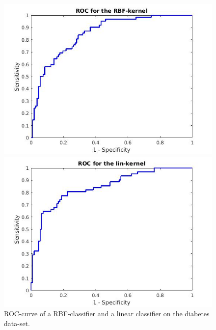 \documentclass[•]{article}
\begin{document}
\begin{figure}[h!]
\centering
\begin{minipage}{.45\textwidth}
\includegraphics[width=.8\textwidth]{rocrbfdiabetes.jpg}
\end{minipage}
\begin{minipage}{.45\textwidth}
\includegraphics[width=.8\textwidth]{roclindiabetes.jpg}
\end{minipage}
\caption{ROC-curve of a RBF-classifier and a linear classifier on the diabetes data-set.}
\end{figure}
\end{document}
